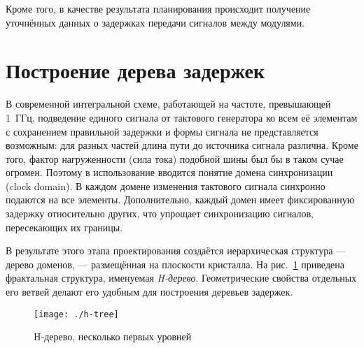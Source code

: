 Кроме того, в качестве результата планирования происходит получение уточнённых данных о задержках передачи сигналов между модулями. 



% 

\section{Построение дерева задержек}

В современной интегральной схеме, работающей на частоте, превышающей 1~ГГц, подведение единого сигнала от тактового генератора ко всем её элементам с сохранением правильной задержки и формы сигнала не представляется возможным: для разных частей длина пути до источника сигнала различна. Кроме того, фактор нагруженности (сила тока) подобной шины был бы в таком сучае огромен. Поэтому в использование вводится понятие домена синхронизации (\abbr clock domain). В каждом домене изменения тактового сигнала синхронно подаются на все элементы. Дополнительно, каждый домен имеет фиксированную задержку относительно других, что упрощает синхронизацию сигналов, пересекающих их границы.

В результате этого этапа проектирования создаётся иерархическая структура — дерево доменов, — размещённая на плоскости кристалла. На рис.~\ref{fig:htree} приведена фрактальная структура, именуемая \textit{H-дерево}. Геометрические свойства отдельных его ветвей делают его удобным для построения деревьев задержек.

\begin{figure}[htbp]
    \centering
    \texttt{[image: ./h-tree]}
    \caption{H-дерево, несколько первых уровней}
    \label{fig:htree}
\end{figure}

